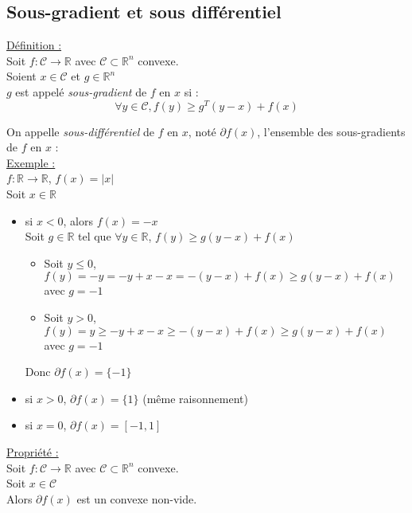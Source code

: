 \documentclass[12pt,a4paper]{article}
\begin{document}
\subsection{Sous-gradient et sous différentiel}

\underline{Définition :}\\
Soit $f : \mathcal{C} \rightarrow \mathbb{R}$ avec $\mathcal{C} \subset \mathbb{R}^n$ convexe.\\
Soient $x \in \mathcal{C}$ et $g \in \mathbb{R}^n$\\
$g$ est appelé \textit{sous-gradient} de $f$ en $x$ si :\\
$$
\forall y \in \mathcal{C}, f(y) \geq g^T (y - x) + f(x)
$$

On appelle \textit{sous-différentiel} de $f$ en $x$, noté $\partial f(x)$, l'ensemble des sous-gradients de $f$ en $x$ :\\


\underline{Exemple :}\\
$f : \mathbb{R} \rightarrow \mathbb{R}$, $f(x) = |x|$\\
Soit $x \in \mathbb{R}$\\

\begin{itemize}
    \item si $x < 0$, alors $f(x) = -x$\\
    Soit $g \in \mathbb{R}$ tel que $\forall y \in \mathbb{R}$, $f(y) \geq g(y - x) + f(x)$
    \begin{itemize}
        \item Soit $y \leq 0$, $f(y) = -y = -y + x - x = -(y-x) + f(x) \geq g(y - x) + f(x)$ avec $g = -1$
        \item Soit $y > 0$, $f(y) = y \geq -y + x - x \geq -(y - x) + f(x) \geq g(y - x) + f(x)$ avec $g = -1$
    \end{itemize}
    Donc $\partial f(x) = \{-1\}$
    \item si $x > 0$, $\partial f(x) = \{1\}$ (même raisonnement)
    \item si $x = 0$, $\partial f(x) = [-1, 1]$
\end{itemize}


\underline{Propriété :}\\
Soit $f : \mathcal{C} \rightarrow \mathbb{R}$ avec $\mathcal{C} \subset \mathbb{R}^n$ convexe.\\
Soit $x \in \mathcal{C}$\\
Alors $\partial f(x)$ est un convexe non-vide.\\
\end{document}
